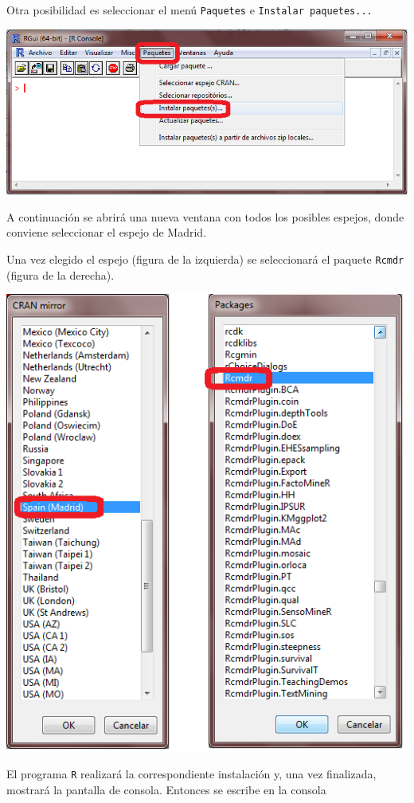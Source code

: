 \documentclass[]{book}
\begin{document}
Otra posibilidad es seleccionar el menú \texttt{Paquetes} e
\texttt{Instalar\ paquetes...}

\includegraphics{figuras/Rcommander1.png}

A continuación se abrirá una nueva ventana con todos los posibles
espejos, donde conviene seleccionar el espejo de Madrid.

Una vez elegido el espejo (figura de la izquierda) se seleccionará el
paquete \texttt{Rcmdr} (figura de la derecha).

\includegraphics{figuras/Rcommander2.png}

El programa \texttt{R} realizará la correspondiente instalación y,
una vez finalizada, mostrará la pantalla de consola. Entonces se escribe
en la consola
\end{document}
